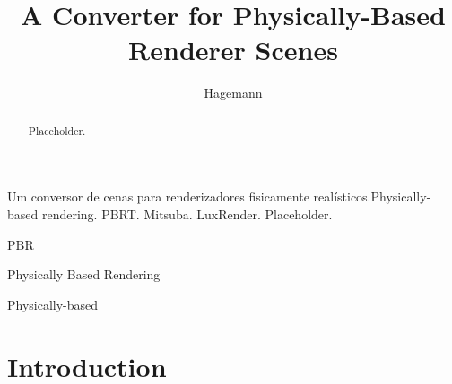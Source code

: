 \documentclass[cic,tc,english]{iiufrgs}
\title{A Converter for Physically-Based Renderer Scenes}
\author{Hagemann}{Luiza de Azambuja}
\begin{document}
\maketitle




\begin{abstract}
    Placeholder.
\end{abstract}

\begin{englishabstract}{Um conversor de cenas para renderizadores fisicamente realísticos.}{Physically-based rendering. PBRT. Mitsuba. LuxRender.}
    Placeholder.
\end{englishabstract}

\listoffigures


\begin{listofabbrv}{PBR}
    \item[PBR] Physically Based Rendering
    \item[PB] Physically-based
\end{listofabbrv}


\tableofcontents

\chapter{Introduction}
\end{document}
